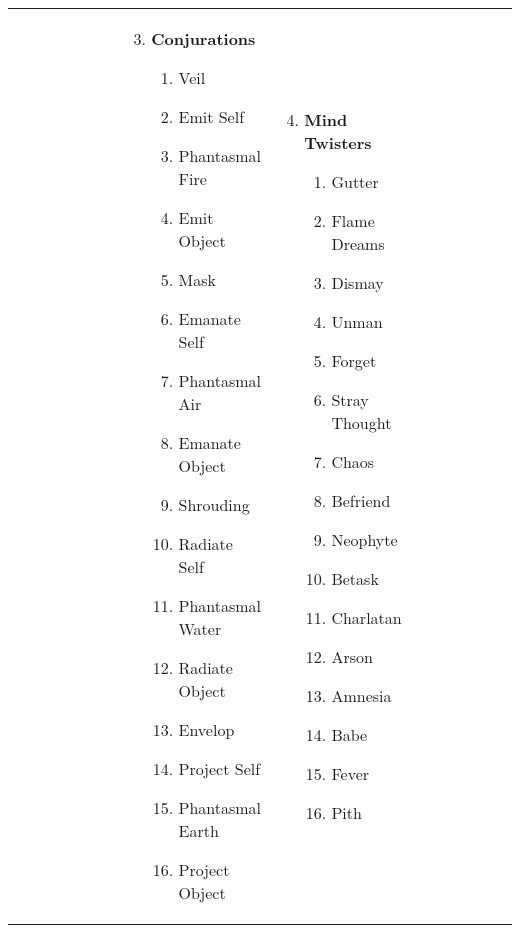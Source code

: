 \begin{tabular}{@{} p{0.25\linewidth} p{0.25\linewidth} p{0.25\linewidth} p{0.25\linewidth}}
\begin{enumerate}
\end{enumerate} &
\begin{enumerate}
	\setcounter{enumi}{2}
	\item \textbf{Conjurations}
	\begin{enumerate}
		\item Veil
		\item Emit Self
		\item Phantasmal Fire
		\item Emit Object
		\item Mask
		\item Emanate Self
		\item Phantasmal Air
		\item Emanate Object
		\item Shrouding
		\item Radiate Self
		\item Phantasmal Water
		\item Radiate Object
		\item Envelop
		\item Project Self
		\item Phantasmal Earth
		\item Project Object
	\end{enumerate}
\end{enumerate} &
\begin{enumerate}
	\setcounter{enumi}{3}
	\item \textbf{Mind Twisters}
	\begin{enumerate}
		\item Gutter
		\item Flame Dreams
		\item Dismay
		\item Unman
		\item Forget
		\item Stray Thought
		\item Chaos
		\item Befriend
		\item Neophyte
		\item Betask
		\item Charlatan
		\item Arson
		\item Amnesia
		\item Babe
		\item Fever
		\item Pith
	\end{enumerate}
\end{enumerate} \\
\end{tabular}
\pagebreak
